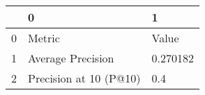 \begin{tabular}{lll}
\toprule
{} &                       0 &         1 \\
\midrule
0 &                  Metric &     Value \\
1 &       Average Precision &  0.270182 \\
2 &  Precision at 10 (P@10) &       0.4 \\
\bottomrule
\end{tabular}
